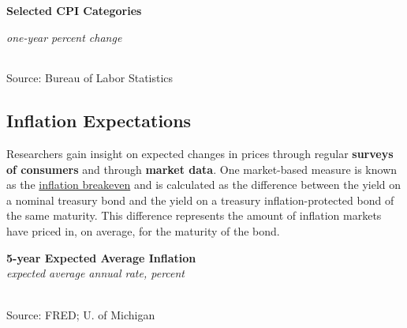 \documentclass{report}
\makeatletter
\newcommand{\tbllink}[1]{\href{https://raw.githubusercontent.com/bdecon/US-chartbook/master/chartbook/data/#1}{\faTable}}
\newcommand*\short[1]{\expandafter\@gobbletwo\number\numexpr#1\relax}
\newcommand{\absnode}[3]{\node[below right, align=left] at (axis cs: #1,#2) {#3};}
\newcommand{\ltdateaxisticks}{
		date coordinates in=x, axis line style={draw=none},
		xmax={2022-03-15},
		max space between ticks=40,	    
		xtick={{2013-01-01}, {2014-01-01}, {2015-01-01}, {2016-01-01}, {2017-01-01}, {2018-01-01}, 
		    {2019-01-01}, {2020-01-01}, {2021-01-01}, {2022-01-01}},
		enlarge y limits={0.06}, enlarge x limits={0.01},
		}
\newcommand{\bbar}[2]{extra #1 ticks = {{#2}}, extra #1 tick labels = ,
		extra #1 tick style = {grid=major, grid style={thick, black!25}},}
\newcommand{\stdline}[4]{\addplot[very thick, no markers, color=#1] 
		table [x=#2, y=#3, col sep=comma] {#4};	}
\newcommand{\thinline}[4]{\addplot[no markers, color=#1] 
		table [x=#2, y=#3, col sep=comma] {#4};	}
\newcommand{\rbar}{
		\fill[color=black!10] (axis cs:{2020-02-01},\pgfkeysvalueof{/pgfplots/ymin}) rectangle 
			(axis cs:{2020-05-01}, \pgfkeysvalueof{/pgfplots/ymax});}
\makeatother
\begin{document}
{{\begin{minipage}{0.76\textwidth}
\normalsize \textbf{Selected CPI Categories}\\
\footnotesize{\textit{one-year percent change}\\
\hspace*{-3mm}  \setlength{\tabcolsep}{2.6pt} \color{black!90}
		{\renewcommand{\arraystretch}{1.5}
\begin{tabular}{p{42mm} R{8.0mm} R{8.0mm} R{8.0mm} R{8.0mm}
		 		 R{8.0mm} R{10.0mm} R{12.0mm}} %
			  \hline
		\end{tabular}}}
\vspace{-2mm}		
		
\footnotesize{Source: Bureau of Labor Statistics}
\end{minipage}
\newpage
\hypertarget{prie}{}
\begin{minipage}{0.76\textwidth}
\subsection*{Inflation Expectations}
\vspace{-1mm}

\small Researchers gain insight on expected changes in prices through regular \textbf{surveys of consumers} and through \textbf{market data}. One market-based measure is known as the \href{https://fred.stlouisfed.org/series/T5YIE}{inflation breakeven} and is calculated as the difference between the yield on a nominal treasury bond and the yield on a treasury inflation-protected bond of the same maturity. This difference represents the amount of inflation markets have priced in, on average, for the maturity of the bond.
\end{minipage}

\begin{minipage}{0.38\textwidth}
\normalsize \textbf{5-year Expected Average Inflation}\\
\footnotesize{\textit{expected average annual rate, percent}}\\
\hspace*{-2mm} \\
\footnotesize{Source: FRED; U. of Michigan} \hfill \tbllink{infbreak.csv}
\end{minipage} \hspace{6mm} 
\begin{minipage}{0.33\textwidth}
\small 


\end{minipage}}}
\end{document}
